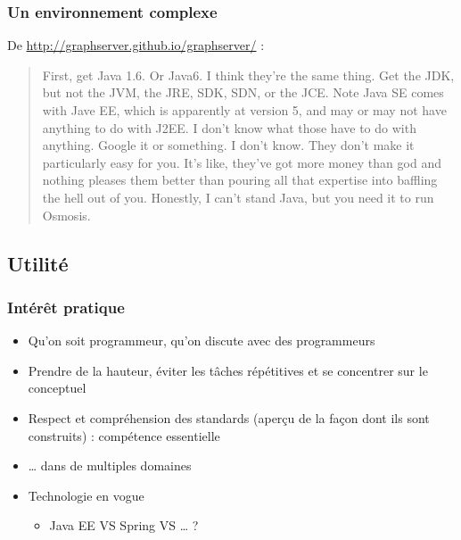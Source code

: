 \documentclass[english, french]{beamer}
\begin{document}
\begin{frame}
	\frametitle{Un environnement complexe}
	De \url{http://graphserver.github.io/graphserver/} :
	\begin{quote}
		First, get Java 1.6. Or Java6. I think they're the same thing. Get the JDK, but not the JVM, the JRE, SDK, SDN, or the JCE. Note Java SE comes with Jave EE, which is apparently at version 5, and may or may not have anything to do with J2EE. I don't know what those have to do with anything. Google it or something. I don't know. They don't make it particularly easy for you. It's like, they've got more money than god and nothing pleases them better than pouring all that expertise into baffling the hell out of you. Honestly, I can't stand Java, but you need it to run Osmosis.
	\end{quote}
\end{frame}

\subsection{Utilité}
\begin{frame}
	\frametitle{Intérêt pratique}
	\begin{itemize}
		\item Qu’on soit programmeur, qu’on discute avec des programmeurs
		\item Prendre de la hauteur, éviter les tâches répétitives et se concentrer sur le conceptuel
		\item Respect et compréhension des standards (aperçu de la façon dont ils sont construits) : compétence essentielle
		\item … dans de multiples domaines
		\item Technologie en vogue
		\begin{itemize}
			\item Java EE VS Spring VS … ?
		\end{itemize}
	\end{itemize}
\end{frame}
\end{document}
